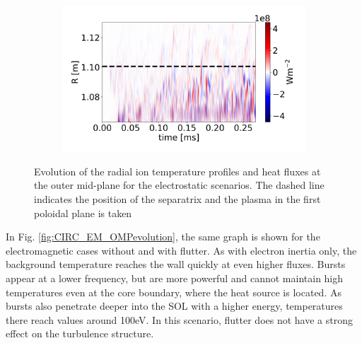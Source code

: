 \begin{figure}[H]
\begin{subfigure}[t]{0.45\textwidth}
	\end{subfigure}
	\begin{subfigure}[t]{0.45\textwidth}
		\centering
		\includegraphics[width=1\textwidth]{schemes/plotOMPtime_spec1_fluxE_psi_PHIJ_mass_1.jpg}
	\end{subfigure}
	\caption[Evolution of the radial ion temperature profiles and heat fluxes at the outer mid-plane for the electrostatic scenarios]{Evolution of the radial ion temperature profiles and heat fluxes at the outer mid-plane for the electrostatic scenarios. The dashed line indicates the position of the separatrix and the plasma in the first poloidal plane is taken}
	\label{fig:CIRC_EI_OMPevolution}
\end{figure}

In Fig. \ref{fig:CIRC_EM_OMPevolution}, the same graph is shown for the electromagnetic cases without and with flutter. As with electron inertia only, the background temperature reaches the wall quickly at even higher fluxes. Bursts appear at a lower frequency, but are more powerful and cannot maintain high temperatures even at the core boundary, where the heat source is located. As bursts also penetrate deeper into the SOL with a higher energy, temperatures there reach values around 100eV. In this scenario, flutter does not have a strong effect on the turbulence structure.

